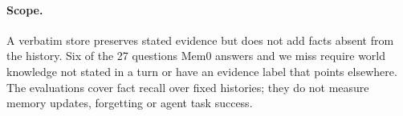 \paragraph{Scope.} A verbatim store preserves stated evidence but does not add facts absent from the history. Six of the 27 questions Mem0 answers and we miss require world knowledge not stated in a turn or have an evidence label that points elsewhere. The evaluations cover fact recall over fixed histories; they do not measure memory updates, forgetting or agent task success.

